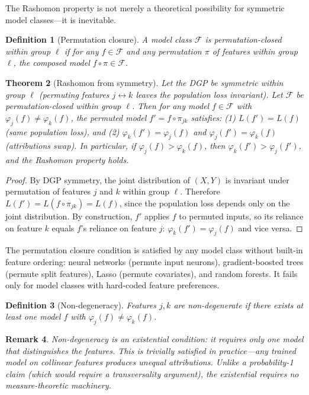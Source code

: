 \documentclass{article}
\newtheorem{theorem}{Theorem}
\newtheorem{definition}[theorem]{Definition}
\newtheorem{remark}[theorem]{Remark}
\begin{document}
The Rashomon property is not merely a theoretical possibility for symmetric model classes---it is inevitable.

\begin{definition}[Permutation closure]
\label{def:perm-closure}
A model class $\mathcal{F}$ is \emph{permutation-closed} within group $\ell$ if for any $f \in \mathcal{F}$ and any permutation $\pi$ of features within group $\ell$, the composed model $f \circ \pi \in \mathcal{F}$.
\end{definition}

\begin{theorem}[Rashomon from symmetry]
\label{thm:rashomon-symmetry}
Let the DGP be symmetric within group $\ell$ (permuting features $j \leftrightarrow k$ leaves the population loss invariant). Let $\mathcal{F}$ be permutation-closed within group $\ell$. Then for any model $f \in \mathcal{F}$ with $\varphi_j(f) \neq \varphi_k(f)$, the permuted model $f' = f \circ \pi_{jk}$ satisfies: (1) $L(f') = L(f)$ (same population loss), and (2) $\varphi_k(f') = \varphi_j(f)$ and $\varphi_j(f') = \varphi_k(f)$ (attributions swap).
In particular, if $\varphi_j(f) > \varphi_k(f)$, then $\varphi_k(f') > \varphi_j(f')$, and the Rashomon property holds.
\end{theorem}

\begin{proof}
By DGP symmetry, the joint distribution of $(X, Y)$ is invariant under permutation of features $j$ and $k$ within group $\ell$. Therefore $L(f') = L(f \circ \pi_{jk}) = L(f)$, since the population loss depends only on the joint distribution. By construction, $f'$ applies $f$ to permuted inputs, so its reliance on feature $k$ equals $f$'s reliance on feature $j$: $\varphi_k(f') = \varphi_j(f)$ and vice versa.
\end{proof}

The permutation closure condition is satisfied by any model class without built-in feature ordering: neural networks (permute input neurons), gradient-boosted trees (permute split features), Lasso (permute covariates), and random forests. It fails only for model classes with hard-coded feature preferences.

\begin{definition}[Non-degeneracy]
\label{def:non-degeneracy}
Features $j, k$ are \emph{non-degenerate} if there exists at least one model $f$ with $\varphi_j(f) \neq \varphi_k(f)$.
\end{definition}

\begin{remark}
Non-degeneracy is an existential condition: it requires only \emph{one} model that distinguishes the features. This is trivially satisfied in practice---any trained model on collinear features produces unequal attributions. Unlike a probability-1 claim (which would require a transversality argument), the existential requires no measure-theoretic machinery.
\end{remark}
\end{document}
